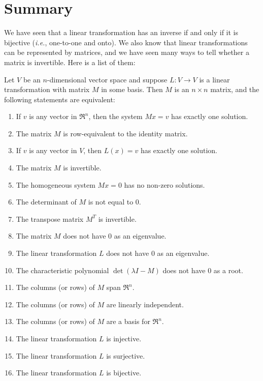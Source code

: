 \section{Summary}\label{thelist}
We have seen that a linear transformation has an inverse if and only if it is bijective ({\itshape i.e.}, one-to-one and onto). We also know that linear transformations can be represented by matrices, and we have seen many ways to tell whether a matrix is invertible. Here is a list of them:
\begin{theorem}[Invertibility]
\label{theorem:invertibility}
Let $V$  be an $n$-dimensional vector space  
and suppose  $L:V\to V$ is a linear transformation with matrix $M$ in some basis.
Then \(M\) is an \(n \times n\) matrix, and 
the following statements are equivalent:
\newpage
\begin{enumerate}
\item If $v$ is any vector in \(\Re^n\), then the system \(Mx=v\) has exactly one solution.
\item The matrix \(M\) is row-equivalent to the identity matrix.
\item If \(v\) is any vector in \(V\), then \(L(x)=v\) has exactly one solution.
\item The matrix \(M\) is invertible.
\item The homogeneous system \(Mx=0\) has no non-zero solutions.
\item The determinant of \(M\) is not equal to \(0\).
\item The transpose matrix \(M^T\) is invertible.
\item The matrix \(M\) does not have \(0\) as an eigenvalue.
\item The linear transformation \(L\) does not have \(0\) as an eigenvalue.
\item The characteristic polynomial \(\det(\lambda I-M)\) does not have \(0\) as a root.
\item The columns (or rows) of \(M\) span \(\Re^n\).
\item The columns (or rows) of \(M\) are linearly independent.
\item The columns (or rows) of \(M\) are a basis for \(\Re^n\).
\item The linear transformation \(L\) is injective.
\item The linear transformation \(L\) is surjective.
\item The linear transformation \(L\) is bijective.
\end{enumerate}
\end{theorem}

